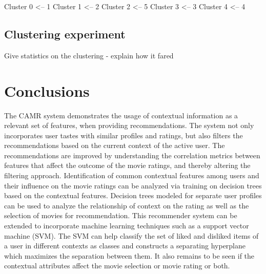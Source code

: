 \documentclass{article}
\begin{document}
Cluster 0 <-- 1
Cluster 1 <-- 2
Cluster 2 <-- 5
Cluster 3 <-- 3
Cluster 4 <-- 4


\subsection{Clustering experiment} 
Give statistics on the clustering - explain how it fared



%  
%
%
%


\section{Conclusions}
The CAMR system demonstrates the usage of contextual information as a relevant set of features, when providing recommendations. The system not only incorporates user tastes with similar profiles and ratings, but also filters the recommendations based on the current context of the active user. The recommendations are improved by understanding the correlation metrics between features that affect the outcome of the movie ratings, and thereby altering the filtering approach. Identification of common contextual features among users and their influence on the movie ratings can be analyzed via training on decision trees based on the contextual features. Decision trees modeled for separate user profiles can be used to analyze the relationship of context on the rating as well as the selection of movies for recommendation. This recommender system can be extended to incorporate machine learning techniques such as a support vector machine (SVM). The SVM can help classify the set of liked and disliked items of a user in different contexts as classes and constructs a separating hyperplane which maximizes the separation between them. It also remains to be seen if the contextual attributes affect the movie selection or movie rating or both.
\end{document}
